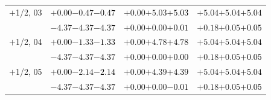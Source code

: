 \documentclass[compress]{beamer}
\begin{document}
\begin{frame}
\begin{tabular}{r | c | c | c}
$+$1/2, 03 & $+0.00$\hspace{0.1 cm}$-0.47$\hspace{0.1 cm}\textcolor{black}{$-0.47$} & $+0.00$\hspace{0.1 cm}$+5.03$\hspace{0.1 cm}\textcolor{black}{$+5.03$} & $+5.04$\hspace{0.1 cm}$+5.04$\hspace{0.1 cm}\textcolor{black}{$+5.04$} \\
           & $-4.37$\hspace{0.1 cm}$-4.37$\hspace{0.1 cm}\textcolor{black}{$-4.37$} & $+0.00$\hspace{0.1 cm}$+0.00$\hspace{0.1 cm}\textcolor{black}{$+0.01$} & $+0.18$\hspace{0.1 cm}$+0.05$\hspace{0.1 cm}\textcolor{black}{$+0.05$} \\
$+$1/2, 04 & $+0.00$\hspace{0.1 cm}$-1.33$\hspace{0.1 cm}\textcolor{black}{$-1.33$} & $+0.00$\hspace{0.1 cm}$+4.78$\hspace{0.1 cm}\textcolor{black}{$+4.78$} & $+5.04$\hspace{0.1 cm}$+5.04$\hspace{0.1 cm}\textcolor{black}{$+5.04$} \\
           & $-4.37$\hspace{0.1 cm}$-4.37$\hspace{0.1 cm}\textcolor{black}{$-4.37$} & $+0.00$\hspace{0.1 cm}$+0.00$\hspace{0.1 cm}\textcolor{black}{$+0.00$} & $+0.18$\hspace{0.1 cm}$+0.05$\hspace{0.1 cm}\textcolor{black}{$+0.05$} \\
$+$1/2, 05 & $+0.00$\hspace{0.1 cm}$-2.14$\hspace{0.1 cm}\textcolor{black}{$-2.14$} & $+0.00$\hspace{0.1 cm}$+4.39$\hspace{0.1 cm}\textcolor{black}{$+4.39$} & $+5.04$\hspace{0.1 cm}$+5.04$\hspace{0.1 cm}\textcolor{black}{$+5.04$} \\
           & $-4.37$\hspace{0.1 cm}$-4.37$\hspace{0.1 cm}\textcolor{black}{$-4.37$} & $+0.00$\hspace{0.1 cm}$+0.00$\hspace{0.1 cm}\textcolor{black}{$-0.01$} & $+0.18$\hspace{0.1 cm}$+0.05$\hspace{0.1 cm}\textcolor{black}{$+0.05$} \\

\end{tabular}
\end{frame}
\end{document}
